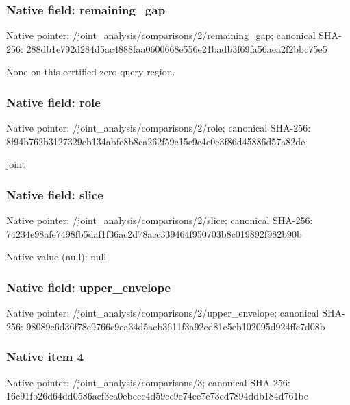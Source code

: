 \documentclass[10pt,a4paper]{article}
\begin{document}
\begingroup\raggedright{}\par\endgroup

\subsubsection{Native field: remaining\_\allowbreak{}gap}
Native pointer: /joint\_\allowbreak{}analysis/comparisons/2/remaining\_\allowbreak{}gap; canonical SHA-256: 288db1e792d284d5ac4888faa0600668e556e21badb3f69fa56aea2f2bbc75e5

\begingroup\raggedright\sloppy None on this certified zero-query region.\par\endgroup

\subsubsection{Native field: role}
Native pointer: /joint\_\allowbreak{}analysis/comparisons/2/role; canonical SHA-256: 8f94b762b3127329eb134abfe8b8ca262f59c15e9c4e0e3f86d45886d57a82de

\begingroup\raggedright\sloppy joint\par\endgroup

\subsubsection{Native field: slice}
Native pointer: /joint\_\allowbreak{}analysis/comparisons/2/slice; canonical SHA-256: 74234e98afe7498fb5daf1f36ac2d78acc339464f950703b8c019892f982b90b

Native value (null): null

\subsubsection{Native field: upper\_\allowbreak{}envelope}
Native pointer: /joint\_\allowbreak{}analysis/comparisons/2/upper\_\allowbreak{}envelope; canonical SHA-256: 98089e6d36f78e9766c9ea34d5acb3611f3a92cd81c5eb102095d924ffc7d08b

\begingroup\raggedright{}\par\endgroup

\subsubsection{Native item 4}
Native pointer: /joint\_\allowbreak{}analysis/comparisons/3; canonical SHA-256: 16c91fb26d64dd0586aef3ca0ebecc4d59cc9e74ee7e73cd7894ddb184d761bc
\end{document}
